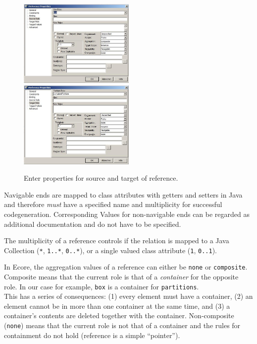 \begin{figure}[htbp]
	\centering
  \includegraphics[width=0.5\textwidth]{pics/memBox26.png}\\
  \vspace{0.5cm}
  \includegraphics[width=0.5\textwidth]{pics/memBox27.png}
	\caption{Enter properties for source and target of reference.}
	\label{fig:reference_ends}
\end{figure}

Navigable ends are mapped to class attributes with getters and setters in Java
and therefore \emph{must} have a specified name and  multiplicity for successful
codegeneration.  
Corresponding Values for non-navigable ends can  be regarded as additional
documentation and do not have to be specified.
 
The multiplicity of a reference controls if the relation is mapped to a Java
Collection (\texttt{*},  \texttt{1..*}, \texttt{0..*}), or a single valued class
attribute (\texttt{1}, \texttt{0..1}).

In Ecore, the aggregation values of a reference can either be \texttt{none} or
\texttt{com\-po\-site}.  Composite means that the current role is that of a
\emph{container} for the opposite role.  In our case for example, \texttt{box}
is a container for \texttt{partitions}.\\  This has a series of
consequences: (1) every element must have a container, (2) an element cannot be
in more than one container at the same time, and (3) a container's contents are
deleted together with the container.  Non-composite (\texttt{none}) means that
the current role is not that of a container and the rules for containment do not
hold (reference is a simple ``pointer'').

